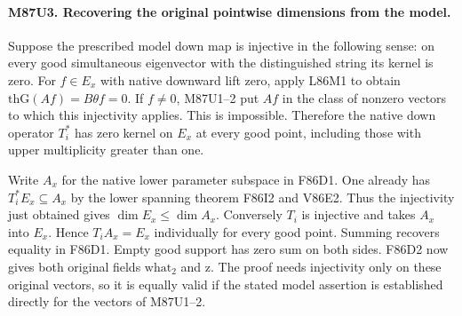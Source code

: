 \paragraph{M87U3. Recovering the original pointwise dimensions from the model.}
Suppose the prescribed model down map is injective in the following
sense: on every good simultaneous eigenvector with the distinguished
string its kernel is zero. For $f\in E_x$ with native downward
lift zero, apply L86M1 to obtain
$\mathrm{thG}(Af)=B\theta f=0$. If $f\ne0$, M87U1--2 put $Af$
in the class of nonzero vectors to which this injectivity applies.
This is impossible. Therefore the native down operator $T_i^*$
has zero kernel on $E_x$ at every good point, including those with
upper multiplicity greater than one.

Write $A_x$ for the native lower parameter subspace in F86D1.
One already has $T_i^*E_x\subseteq A_x$ by the lower spanning
theorem F86I2 and V86E2. Thus the injectivity just obtained
gives $\dim E_x\le\dim A_x$. Conversely $T_i$ is injective
and takes $A_x$ into $E_x$. Hence $T_iA_x=E_x$ individually
for every good point. Summing recovers equality in F86D1.
Empty good support has zero sum on both sides. F86D2 now gives
both original fields $\mathrm{what}_2$ and $\mathrm z$.
The proof needs injectivity only on these original vectors,
so it is equally valid if the stated model assertion is
established directly for the vectors of M87U1--2.
